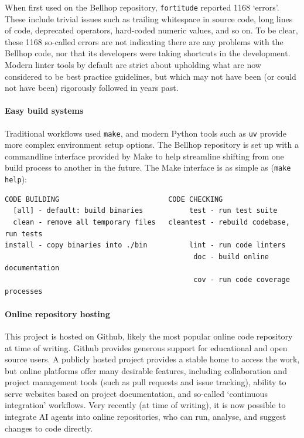 \documentclass{internoise2026-wr}
\begin{document}
When first used on the Bellhop repository, \verb|fortitude| reported 1168 `errors'.
These include trivial issues such as trailing whitespace in source code, long lines of code, deprecated operators, hard-coded numeric values, and so on.
To be clear, these 1168 so-called errors are not indicating there are any problems with the Bellhop code, nor that its developers were taking shortcuts in the development.
Modern linter tools by default are strict about upholding what are now considered to be best practice guidelines, but which may not have been (or could not have been) rigorously followed in years past.

\paragraph{Easy build systems}

Traditional workflows used \verb|make|, and modern Python tools such as \verb|uv| provide more complex environment setup options.
The Bellhop repository is set up with a commandline interface provided by Make to help streamline shifting from one build process to another in the future.
The Make interface is as simple as (\verb|make help|):
\small
\begin{verbatim}
CODE BUILDING                          CODE CHECKING
  [all] - default: build binaries           test - run test suite
  clean - remove all temporary files   cleantest - rebuild codebase, run tests
install - copy binaries into ./bin          lint - run code linters
                                             doc - build online documentation
                                             cov - run code coverage processes
\end{verbatim}
\normalsize

\paragraph{Online repository hosting}

This project is hosted on Github, likely the most popular online code repository at time of writing.
Github provides generous support for educational and open source users.
A publicly hosted project provides a stable home to access the work, but online platforms offer many desirable features, including collaboration and project management tools (such as pull requests and issue tracking), ability to serve websites based on project documentation, and so-called `continuous integration' workflows.
Very recently (at time of writing), it is now possible to integrate AI agents into online repositories, who can run, analyse, and suggest changes to code directly.
\end{document}
